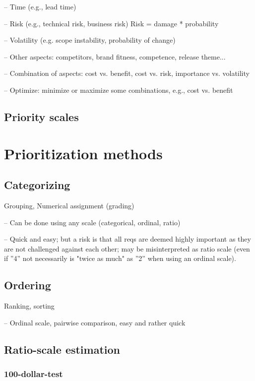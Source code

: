 --  Time (e.g., lead time)

--  Risk (e.g., technical risk, business risk) Risk = damage * probability


--  Volatility (e.g. scope instability, probability of change)

-- Other aspects: competitors, brand fitness, competence, release theme...

-- Combination of aspects: cost vs. benefit, cost vs. risk, importance vs. volatility

-- Optimize: minimize or maximize some combinations, e.g., cost vs. benefit

\subsection{Priority scales}

\section{Prioritization methods}

\subsection{Categorizing}

Grouping, Numerical assignment (grading)

-- Can be done using any scale (categorical, ordinal, ratio)

-- Quick and easy; but a risk is that all reqs are deemed highly important as they are
not challenged against each other; may be misinterpreted as ratio scale (even if
”4” not necessarily is "twice as much" as ”2” when using an ordinal scale).

\subsection{Ordering}

Ranking, sorting

-- Ordinal scale, pairwise comparison, easy and rather quick


\subsection{Ratio-scale estimation}
  
\subsubsection{100-dollar-test}

